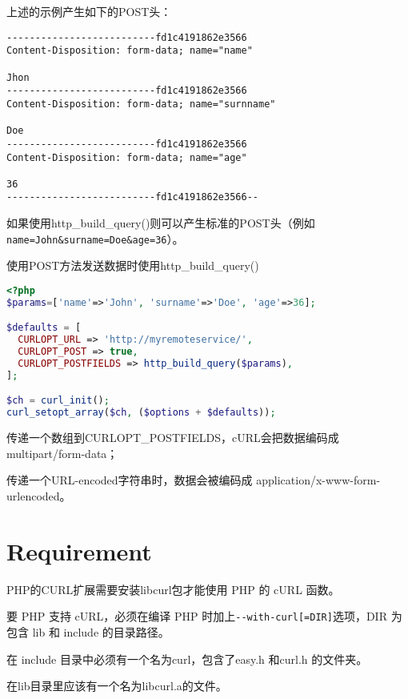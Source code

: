 上述的示例产生如下的POST头：

\begin{lstlisting}
--------------------------fd1c4191862e3566
Content-Disposition: form-data; name="name"

Jhon
--------------------------fd1c4191862e3566
Content-Disposition: form-data; name="surnname"

Doe
--------------------------fd1c4191862e3566
Content-Disposition: form-data; name="age"

36
--------------------------fd1c4191862e3566--
\end{lstlisting}

如果使用http\_build\_query()则可以产生标准的POST头（例如\texttt{name=John\&surname=Doe\&age=36}）。

\begin{example}
使用POST方法发送数据时使用http\_build\_query()
\begin{lstlisting}[language=PHP]
<?php
$params=['name'=>'John', 'surname'=>'Doe', 'age'=>36];

$defaults = [
  CURLOPT_URL => 'http://myremoteservice/', 
  CURLOPT_POST => true,
  CURLOPT_POSTFIELDS => http_build_query($params),
];

$ch = curl_init();
curl_setopt_array($ch, ($options + $defaults));
\end{lstlisting}
\end{example}


\begin{compactitem}
\item 传递一个数组到CURLOPT\_POSTFIELDS，cURL会把数据编码成 multipart/form-data；
\item 传递一个URL-encoded字符串时，数据会被编码成 application/x-www-form-urlencoded。
\end{compactitem}


\section{Requirement}

PHP的CURL扩展需要安装libcurl包才能使用 PHP 的 cURL 函数。

要 PHP 支持 cURL，必须在编译 PHP 时加上\texttt{-\/-with-curl[=DIR]}选项，DIR 为包含 lib 和 include 的目录路径。

\begin{compactitem}
\item 在 include 目录中必须有一个名为curl，包含了easy.h 和curl.h 的文件夹。
\item 在lib目录里应该有一个名为libcurl.a的文件。
\end{compactitem}


